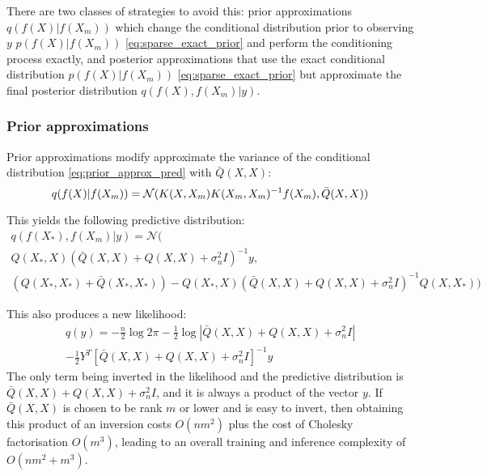 There are two classes of strategies to avoid this: prior approximations $q(f(X) | f(X_m))$ which change the conditional distribution prior to observing $y$ $p(f(X) | f(X_m))$ \ref{eq:sparse_exact_prior} and perform the conditioning process exactly, and posterior approximations that use the exact conditional distribution $p(f(X) | f(X_m))$ \ref{eq:sparse_exact_prior} but approximate the final posterior distribution $q(f(X), f(X_m) | y)$. 

\subsubsection{Prior approximations}
Prior approximations modify approximate the variance of the conditional distribution \ref{eq:prior_approx_pred} with $\bar{Q}(X, X)$:
\begin{equation*}
    q(f(X) | f(X_m)) = \mathcal{N}( \\
        K(X, X_m) K(X_m, X_m)^{-1} f(X_m), \\
        \bar{Q}(X, X)
    )
\end{equation*}

This yields the following predictive distribution:
\begin{equation} \label{eq:prior_approx_pred}
    \begin{aligned}
        q(f(X_*), f(X_m) | y ) = \mathcal{N}( \\
        Q(X_*, X) \left( \bar{Q}(X, X) + Q(X, X) + \sigma_n^2 I \right)^{-1} y, \\
        \left( Q(X_*, X_*) + \bar{Q}(X_*, X_*) \right) - Q(X_*, X) \left( \bar{Q}(X, X) + Q(X, X) + \sigma_n^2 I \right)^{-1} Q(X, X_*)
    )
    \end{aligned}
\end{equation}

This also produces a new likelihood:
\begin{equation} \label{eq:prior_approx_likelihood}
    \begin{aligned}
        q(y) = -\frac{n}{2} \log 2\pi
        - \frac{1}{2} \log | \bar{Q}(X, X) + Q(X, X) + \sigma_n^2 I | \\
        - \frac{1}{2} Y^T [\bar{Q}(X, X) + Q(X, X) + \sigma_n^2 I]^{-1} y
    \end{aligned}
\end{equation}
The only term being inverted in the likelihood and the predictive distribution is $\bar{Q}(X, X) + Q(X, X) + \sigma_n^2 I$, and it is always a product of the vector $y$. If $\bar{Q}(X, X)$ is chosen to be rank $m$ or lower and is easy to invert, then obtaining this product of an inversion costs $O(nm^2)$ plus the cost of Cholesky factorisation $O(m^3)$, leading to an overall training and inference complexity of $O(nm^2 + m^3)$.


